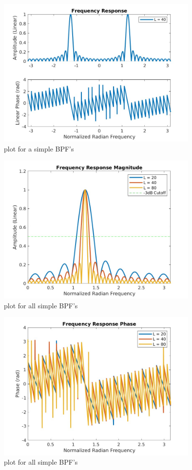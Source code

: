 \documentclass[a4paper, 11pt]{exam}
\begin{document}
\begin{figure}[h!]
  \centering
  \hspace*{-1.5cm}\includegraphics[width=10cm]{../images/4_1a.jpg}
  \caption{plot for a simple BPF's}
  \label{fig:4_1a}
\end{figure}
\newline
\begin{figure}[h!]
  \centering
  \hspace*{-1.5cm}\includegraphics[width=10cm]{../images/4_1a_freqresponses.jpg}
  \caption{plot for all simple BPF's}
  \label{fig:4_1ac}
\end{figure}
\newpage
\begin{figure}[h!]
  \centering
  \hspace*{-1.5cm}\includegraphics[width=10cm]{../images/4_1a_freqresponse_phase.jpg}
  \caption{plot for all simple BPF's}
  \label{fig:4_1ac2}
\end{figure}
\end{document}
